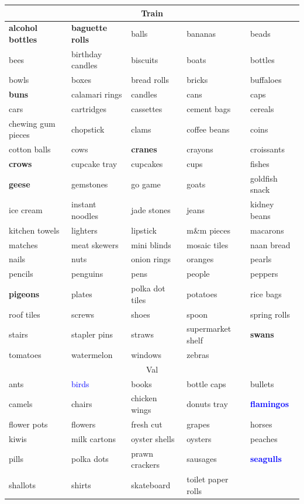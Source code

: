 \begin{tabular}{lllll}
 \toprule

\multicolumn{5}{c}{Train} \\
\midrule
\textbf{alcohol bottles}&\textbf{baguette rolls}&balls&bananas&beads\\
bees&birthday candles&biscuits&boats&bottles\\
bowls&boxes&bread rolls&bricks&buffaloes\\
\textbf{buns}&calamari rings&candles&cans&caps\\
cars&cartridges&cassettes&cement bags&cereals\\
chewing gum pieces&chopstick&clams&coffee beans&coins\\
cotton balls&cows&\textbf{cranes}&crayons&croissants\\
\textbf{crows}&cupcake tray&cupcakes&cups&fishes\\
\textbf{geese}&gemstones&go game&goats&goldfish snack\\
ice cream&instant noodles&jade stones&jeans&kidney beans\\
kitchen towels&lighters&lipstick&m\&m pieces&macarons\\
matches&meat skewers&mini blinds&mosaic tiles&naan bread\\
nails&nuts&onion rings&oranges&pearls\\
pencils&penguins&pens&people&peppers\\
\textbf{pigeons}&plates&polka dot tiles&potatoes&rice bags\\
roof tiles&screws&shoes&spoon&spring rolls\\
stairs&stapler pins&straws&supermarket shelf&\textbf{swans}\\
tomatoes&watermelon&windows&zebras\\

\midrule
\multicolumn{5}{c}{Val} \\
\midrule
ants&\textcolor{blue}{birds}&books&bottle caps&bullets\\
camels&chairs&chicken wings&donuts tray&\textbf{\textcolor{blue}{flamingos}}\\
flower pots&flowers&fresh cut&grapes&horses\\
kiwis&milk cartons&oyster shells&oysters&peaches\\
pills&polka dots&prawn crackers&sausages&\textbf{\textcolor{blue}{seagulls}}\\
shallots&shirts&skateboard&toilet paper rolls\\


\end{tabular}
